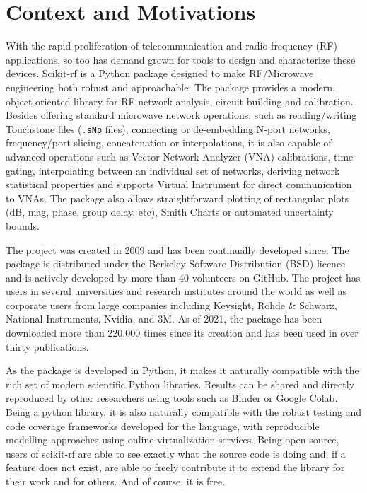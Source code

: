 \documentclass{IEEEjmw}
\begin{document}
\begin{IEEEkeywords}

\end{IEEEkeywords}

\maketitle

\section{Context and Motivations}
With the rapid proliferation of telecommunication and radio-frequency (RF) applications, so too has demand grown for tools to design and characterize these devices. Scikit-rf is a Python package designed to make RF/Microwave engineering both robust and approachable. The package provides a modern, object-oriented library for RF network analysis, circuit building and calibration. Besides offering standard microwave network operations, such as reading/writing Touchstone files (\texttt{.sNp} files), connecting or de-embedding N-port networks, frequency/port slicing, concatenation or interpolations, it is also capable of advanced operations such as Vector Network Analyzer (VNA) calibrations, time-gating, interpolating between an individual set of networks, deriving network statistical properties and supports Virtual Instrument for direct communication to VNAs. The package also allows straightforward plotting of rectangular plots (dB, mag, phase, group delay, etc), Smith Charts or automated uncertainty bounds.
 
The project was created in 2009 and has been continually developed since. The package is distributed under the Berkeley Software Distribution (BSD) licence and is actively developed by more than 40 volunteers on GitHub. The project has users in several universities and research institutes around the world as well as corporate users from large companies including Keysight, Rohde \& Schwarz, National Instruments, Nvidia, and 3M. As of 2021, the package has been downloaded more than 220,000 times since its creation and has been used in over thirty publications.

As the package is developed in Python, it makes it naturally compatible with the rich set of modern scientific Python libraries. Results can be shared and directly reproduced by other researchers using tools such as Binder or Google Colab. Being a python library, it is also naturally compatible with the robust testing and code coverage frameworks developed for the language, with reproducible modelling approaches using online virtualization services. Being open-source, users of scikit-rf are able to see exactly what the source code is doing and, if a feature does not exist, are able to freely contribute it to extend the library for their work and for others. And of course, it is free.
\end{document}

